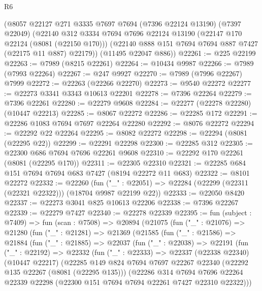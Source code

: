 \begin{lexlean}{R6}
\begin{coremodule}
    (@8057
      @22127
      @271
      @3335
      @7697
      @7694
      (@7396 @22124 @13190)
      (@7397 @22049)
      (@22140
        @312
        @3334
        @7694
        @7696
        @22124
        @13190
        (@22147 @170 @22124 (@8081 (@22150 @170)))
        (@22140 @888 @151 @7694 @7694 @887 @7427 (@22175 @11 @887) @22179))
      (@11495 @22047 @886))
@22261 := @225 @22199
@22263 := @7989 (@8215 @22261)
@22264 := @10434 @9987
@22266 := @7989 (@7993 @22264)
@22267 := @247 @9927
@22270 := @7989 (@7996 @22267) @7999
@22272 := @22263 (@22266 @22270)
@22273 := @9540 @22272
@22277 := @22273 @3341 @3343 @10613 @22201
@22278 := @7396 @22264
@22279 := @7396 @22261
@22280 := @22279 @9608
@22284 := @22277 (@22278 @22280) (@10447 @22213)
@22285 := @8067 @22272
@22286 := @22285 @172
@22291 := @22286 @1083 @7694 @7697 @22264 @22280
@22292 := @8076 @22272
@22294 := @22292 @22 @22264
@22295 := @8082 @22272
@22298 := @22294 (@8081 (@22295 @22))
@22299 := @22291 @22298
@22300 := @22285 @312
@22305 := @22300 @686 @7694 @7696 @22261 @9608
@22310 := @22292 @170 @22261 (@8081 (@22295 @170))
@22311 := @22305 @22310
@22321 := @22285 @684 @151 @7694 @7694 @683 @7427 (@8194 @22272 @11 @683)
@22322 := @8101 @22272
@22332 := @22260
    (fun ("_" : @22051) => @22284 (@22299 (@22311 (@22321 @22322))) (@18704 @9987 @22199 @22))
@22333 := @22050 @8420
@22337 := @22273 @3041 @825 @10613 @22206
@22338 := @7396 @22267
@22339 := @22279 @7427
@22340 := @22278 @22339
@22395 := fun (subject : @7409) =>
  fun (scan : @7508) =>
  @20894
    (@21075
      (fun ("_" : @21076) =>
      @21280
        (fun ("_" : @21281) =>
        @21369
          (@21585
            (fun ("_" : @21586) =>
            @21884
              (fun ("_" : @21885) =>
              @22037
                (fun ("_" : @22038) =>
                @22191
                  (fun ("_" : @22192) =>
                  @22332
                    (fun ("_" : @22333) =>
                    @22337
                      (@22338 @22340)
                      (@10447 @22217)
                      (@22285
                        @149
                        @824
                        @7694
                        @7697
                        @22267
                        @22340
                        (@22292 @135 @22267 (@8081 (@22295 @135)))
                        (@22286
                          @314
                          @7694
                          @7696
                          @22264
                          @22339
                          @22298
                          (@22300 @151 @7694 @7694 @22261 @7427 @22310 @22322)))

\end{coremodule}
\end{lexlean}
